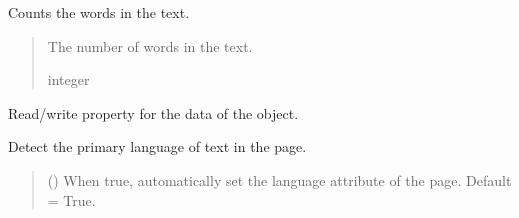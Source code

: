 \documentclass[letterpaper,10pt,english]{sphinxmanual}
\begin{document}
\begin{fulllineitems}

\begin{fulllineitems}
\label{\detokenize{generated/bp_text.pdf:bp_text.pdf.PdfPage.count_words}}
\pysigstartsignatures
\pysiglinewithargsret
{}
{}
{}
\pysigstopsignatures
\sphinxAtStartPar
Counts the words in the text.
\begin{quote}\begin{description}
\sphinxAtStartPar
The number of words in the text.

\sphinxAtStartPar
integer

\end{description}\end{quote}

\end{fulllineitems}


\begin{fulllineitems}
\label{\detokenize{generated/bp_text.pdf:bp_text.pdf.PdfPage.data}}
\pysigstartsignatures
\pysigline
{}
\pysigstopsignatures
\sphinxAtStartPar
Read/write property for the data of the object.

\end{fulllineitems}


\begin{fulllineitems}
\label{\detokenize{generated/bp_text.pdf:bp_text.pdf.PdfPage.detect_lang}}
\pysigstartsignatures
\pysiglinewithargsret
{}
{}
{}
\pysigstopsignatures
\sphinxAtStartPar
Detect the primary language of text in the page.
\begin{quote}\begin{description}
\sphinxAtStartPar
{} () \textendash{} When true, automatically set the language attribute of
the page. Default = True.


\end{description}
\end{quote}
\end{fulllineitems}
\end{fulllineitems}
\end{document}
